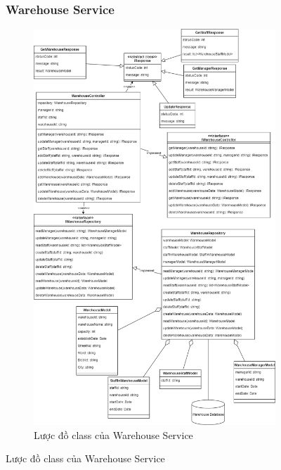 \begin{figure}[!htp]
\subsubsection{Warehouse Service}
\begin{figure}[!htp]
	\centering
	\includegraphics[width=11cm]{img/Architecture/service/WarehouseService.png}
	\newline
	\caption{Lược đồ class của Warehouse Service}
\end{figure}



\end{figure}
